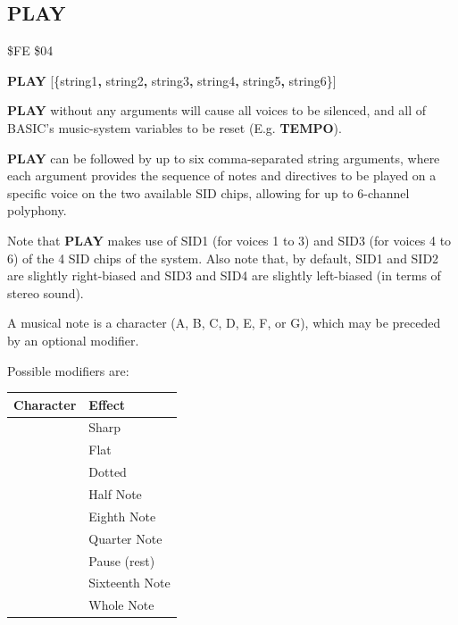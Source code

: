 \subsection{PLAY}
\begin{description}[leftmargin=2cm,style=nextline]
\item [Token:] \$FE \$04
\item [Format:] {\bf PLAY} [\{string1{\bf,} string2{\bf,} string3{\bf,}
		string4{\bf,} string5{\bf,} string6\}]
\item [Usage:] {\bf PLAY} without any arguments will cause all voices to be silenced,
               and all of BASIC's music-system variables to be reset (E.g. {\bf TEMPO}).

               {\bf PLAY} can be followed by up to six comma-separated string arguments,
               where each argument provides the sequence of notes and directives to be played on
               a specific voice on the two available SID chips, allowing for up to 6-channel polyphony.

               Note that {\bf PLAY} makes use of SID1 (for voices 1 to 3) and SID3 (for voices 4 to 6)
               of the 4 SID chips of the system. Also note that, by default, SID1 and SID2 are slightly
               right-biased and SID3 and SID4 are slightly left-biased (in terms of stereo sound).

               A musical note is a character (A, B, C, D, E, F, or G),
               which may be preceded by an optional modifier.

               Possible modifiers are:
\begin{center}
{\setlength{\tabcolsep}{1mm}
\begin{tabular}{*{1}{|c}|l|}
\hline
{\bf Character}  & {\bf Effect} \\
\hline
\screentext{\#} & Sharp \\
\screentext{\$} & Flat \\
  & Dotted \\
  & Half Note \\
  & Eighth Note \\
  & Quarter Note \\
  & Pause (rest) \\
  & Sixteenth Note \\
  & Whole Note \\
\hline
\end{tabular}
}
\end{center}


\end{description}
